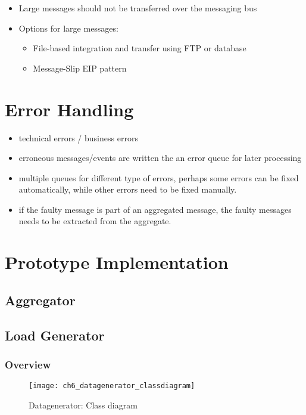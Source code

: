 \begin{itemize}
	\item Large messages should not be transferred over the messaging bus
	\item Options for large messages:
	\begin{itemize}
		\item File-based integration and transfer using FTP or database
		\item Message-Slip EIP pattern
	\end{itemize}
\end{itemize}

\section{Error Handling}

\begin{itemize}
	\item technical errors / business errors
	\item erroneous messages/events are written the an error queue for later processing
	\item multiple queues for different type of errors, perhaps some errors can be fixed automatically, while other errors need to be fixed manually.
	\item if the faulty message is part of an aggregated message, the faulty messages needs to be extracted from the aggregate.
\end{itemize}

\section{Prototype Implementation}

\subsection{Aggregator}

\subsection{Load Generator}

\subsubsection{Overview}

\begin{figure}[htpb]
	\centering
	\texttt{[image: ch6\_datagenerator\_classdiagram]}
	\caption{Datagenerator: Class diagram}
	\label{fig:ch5_datagenerator_classdiagram}
\end{figure}

